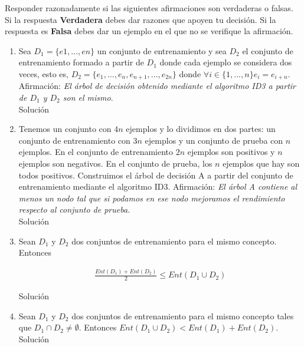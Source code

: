 \documentclass{mulcia_aa}
\begin{document}
\begin{question}
Responder razonadamente si las siguientes afirmaciones son verdaderas o falsas. Si la respuesta \textbf{Verdadera} debes dar razones que apoyen tu decisión. Si la respuesta es \textbf{Falsa} debes dar un ejemplo en el que no se verifique la afirmación.
\end{question}
\begin{solution}
    \begin{enumerate}[label=(\alph*)]
        \item Sea $D_1 = \{e1,..., en\}$ un conjunto de entrenamiento y sea $D_2$ el conjunto de entrenamiento formado a partir de $D_1$ donde cada ejemplo se considera dos veces, esto es, $D_2 = \{e_1,...,e_n,e_{n+1},...,e_{2n}\}$ donde $\forall i\in\{1,...,n\}e_i = e_{i+n}$. Afirmación: \emph{El árbol de decisión obtenido mediante el algoritmo ID3 a partir de $D_1$ y $D_2$ son el mismo}.\\
        
        Solución    
        
        \item Tenemos un conjunto con $4n$ ejemplos y lo dividimos en dos partes: un conjunto de entrenamiento con $3n$ ejemplos y un conjunto de prueba con $n$ ejemplos. En el conjunto de entrenamiento $2n$ ejemplos son positivos y $n$ ejemplos son negativos. En el conjunto de prueba, los $n$ ejemplos que hay son todos positivos. Construimos el árbol de decisión A a partir del conjunto de entrenamiento mediante el algoritmo ID3. Afirmación: \emph{El árbol A contiene al menos un nodo tal que si podamos en ese nodo mejoramos el rendimiento respecto al conjunto de prueba.}\\
        
        Solución    
        
        \item Sean $D_1$ y $D_2$ dos conjuntos de entrenamiento para el mismo concepto. Entonces
        
        \begin{align}
            \frac{Ent(D_1)+Ent(D_2)}{2}\le Ent(D_1\cup D_2)
        \end{align}

        
        Solución
        
        \item Sean $D_1$ y $D_2$ dos conjuntos de entrenamiento para el mismo concepto tales que $D_1 \cap D_2 \not = \emptyset$. Entonces $Ent(D_1 \cup D_2) < Ent(D_1) + Ent(D_2)$.\\

        Solución
    \end{enumerate}
\end{solution}
\end{document}
